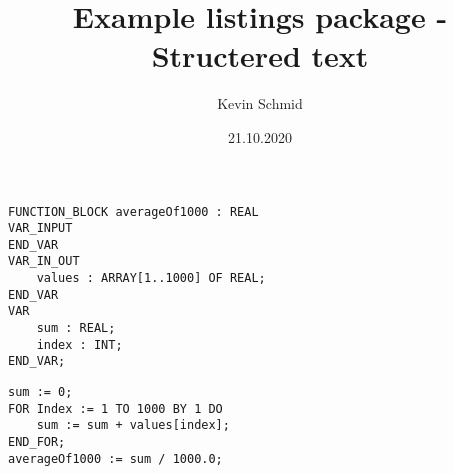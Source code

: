 \documentclass[12pt, a4paper, oneside]{scrreprt}
\title{Example listings package - Structered text}
\author{Kevin Schmid}
\date{21.10.2020}
\begin{document}
\begin{lstlisting}[language=ST, caption=function deklaration]
FUNCTION_BLOCK averageOf1000 : REAL
VAR_INPUT
END_VAR
VAR_IN_OUT
	values : ARRAY[1..1000] OF REAL;
END_VAR
VAR
	sum : REAL;
	index : INT;
END_VAR;
\end{lstlisting}

\begin{lstlisting}[language=ST, caption=function block]
sum := 0;
FOR Index := 1 TO 1000 BY 1 DO
	sum := sum + values[index];
END_FOR;
averageOf1000 := sum / 1000.0;
\end{lstlisting}
\end{document}

